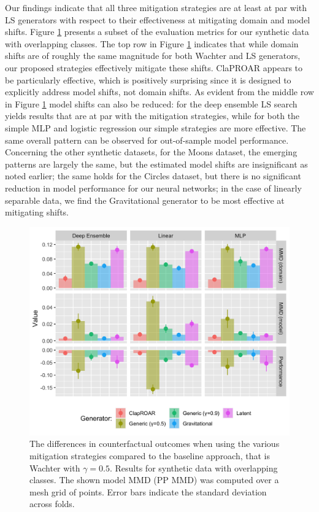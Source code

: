 \documentclass[conference,final,]{IEEEtran}
\theoremstyle{definition}
\theoremstyle{definition}
\theoremstyle{definition}
\theoremstyle{definition}
\theoremstyle{remark}
\begin{document}
Our findings indicate that all three mitigation strategies are at least at par with LS generators with respect to their effectiveness at mitigating domain and model shifts. Figure \ref{fig:mitigate-results} presents a subset of the evaluation metrics for our synthetic data with overlapping classes. The top row in Figure \ref{fig:mitigate-results} indicates that while domain shifts are of roughly the same magnitude for both Wachter and LS generators, our proposed strategies effectively mitigate these shifts. ClaPROAR appears to be particularly effective, which is positively surprising since it is designed to explicitly address model shifts, not domain shifts. As evident from the middle row in Figure \ref{fig:mitigate-results} model shifts can also be reduced: for the deep ensemble LS search yields results that are at par with the mitigation strategies, while for both the simple MLP and logistic regression our simple strategies are more effective. The same overall pattern can be observed for out-of-sample model performance. Concerning the other synthetic datasets, for the Moons dataset, the emerging patterns are largely the same, but the estimated model shifts are insignificant as noted earlier; the same holds for the Circles dataset, but there is no significant reduction in model performance for our neural networks; in the case of linearly separable data, we find the Gravitational generator to be most effective at mitigating shifts.

\begin{figure}

{\centering \includegraphics[width=0.9\linewidth]{www/mitigation_synthetic_results} 

}

\caption{The differences in counterfactual outcomes when using the various mitigation strategies compared to the baseline approach, that is Wachter with $\gamma=0.5$. Results for synthetic data with overlapping classes. The shown model MMD (PP MMD) was computed over a mesh grid of points. Error bars indicate the standard deviation across folds.}\label{fig:mitigate-results}
\end{figure}
\end{document}
